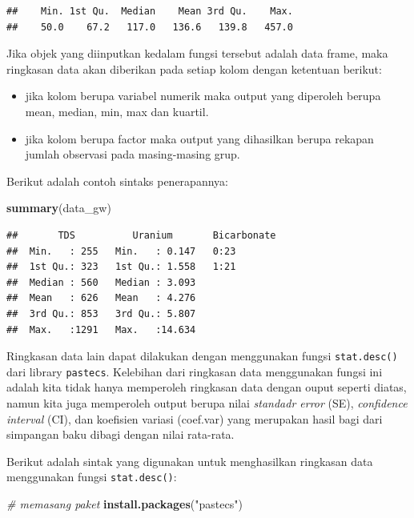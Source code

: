 \documentclass[]{book}
\newenvironment{Shaded}{\begin{snugshade}}{\end{snugshade}}
\newcommand{\KeywordTok}[1]{\textcolor[rgb]{0.13,0.29,0.53}{\textbf{#1}}}
\newcommand{\StringTok}[1]{\textcolor[rgb]{0.31,0.60,0.02}{#1}}
\newcommand{\CommentTok}[1]{\textcolor[rgb]{0.56,0.35,0.01}{\textit{#1}}}
\newcommand{\NormalTok}[1]{#1}
\providecommand{\tightlist}{%
  \setlength{\itemsep}{0pt}\setlength{\parskip}{0pt}}
\begin{document}
\begin{verbatim}
##    Min. 1st Qu.  Median    Mean 3rd Qu.    Max. 
##    50.0    67.2   117.0   136.6   139.8   457.0
\end{verbatim}

Jika objek yang diinputkan kedalam fungsi tersebut adalah data frame,
maka ringkasan data akan diberikan pada setiap kolom dengan ketentuan
berikut:

\begin{itemize}
\tightlist
\item
  jika kolom berupa variabel numerik maka output yang diperoleh berupa
  mean, median, min, max dan kuartil.
\item
  jika kolom berupa factor maka output yang dihasilkan berupa rekapan
  jumlah observasi pada masing-masing grup.
\end{itemize}

Berikut adalah contoh sintaks penerapannya:

\begin{Shaded}
\begin{Highlighting}[]
\KeywordTok{summary}\NormalTok{(data_gw)}
\end{Highlighting}
\end{Shaded}

\begin{verbatim}
##       TDS          Uranium       Bicarbonate
##  Min.   : 255   Min.   : 0.147   0:23       
##  1st Qu.: 323   1st Qu.: 1.558   1:21       
##  Median : 560   Median : 3.093              
##  Mean   : 626   Mean   : 4.276              
##  3rd Qu.: 853   3rd Qu.: 5.807              
##  Max.   :1291   Max.   :14.634
\end{verbatim}

Ringkasan data lain dapat dilakukan dengan menggunakan fungsi
\texttt{stat.desc()} dari library \texttt{pastecs}. Kelebihan dari
ringkasan data menggunakan fungsi ini adalah kita tidak hanya memperoleh
ringkasan data dengan ouput seperti diatas, namun kita juga memperoleh
output berupa nilai \emph{standadr error} (SE), \emph{confidence
interval} (CI), dan koefisien variasi (coef.var) yang merupakan hasil
bagi dari simpangan baku dibagi dengan nilai rata-rata.

Berikut adalah sintak yang digunakan untuk menghasilkan ringkasan data
menggunakan fungsi \texttt{stat.desc()}:

\begin{Shaded}
\begin{Highlighting}[]
\CommentTok{# memasang paket}
\KeywordTok{install.packages}\NormalTok{(}\StringTok{"pastecs"}\NormalTok{)}
\end{Highlighting}
\end{Shaded}
\end{document}
